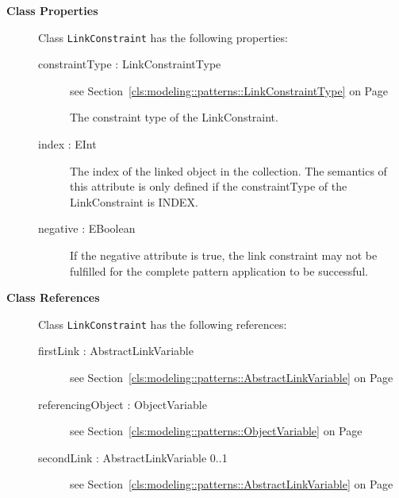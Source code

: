 \begin{description}

	\item[\textbf{Class Properties}] Class \texttt{LinkConstraint} has the following properties:
	\begin{description}
\item[constraintType : LinkConstraintType 	]
see Section~\ref{cls:modeling::patterns::LinkConstraintType} on Page~\pageref{cls:modeling::patterns::LinkConstraintType}\hspace{\fill}
\nopagebreak


	
			
The constraint type of the LinkConstraint.	
		
	
\item[index : EInt 	]
\hspace{\fill}
\nopagebreak


	
			
The index of the linked object in the collection. The semantics of this attribute is only defined if the constraintType of the LinkConstraint is INDEX.	
		
	
\item[negative : EBoolean 	]
\hspace{\fill}
\nopagebreak


	
			
If the negative attribute is true, the link constraint may not be fulfilled for the complete pattern application to be successful.	
		
	
	\end{description}
	
	\item[\textbf{Class References}] Class \texttt{LinkConstraint} has the following references:
	\begin{description}
\item[firstLink : AbstractLinkVariable 	]
see Section~\ref{cls:modeling::patterns::AbstractLinkVariable} on Page~\pageref{cls:modeling::patterns::AbstractLinkVariable}\hspace{\fill}
\nopagebreak


	
\item[referencingObject : ObjectVariable 	]
see Section~\ref{cls:modeling::patterns::ObjectVariable} on Page~\pageref{cls:modeling::patterns::ObjectVariable}\hspace{\fill}
\nopagebreak


	
\item[secondLink : AbstractLinkVariable 			0..1]
see Section~\ref{cls:modeling::patterns::AbstractLinkVariable} on Page~\pageref{cls:modeling::patterns::AbstractLinkVariable}\hspace{\fill}
\nopagebreak


	
	\end{description}
	

\end{description}

